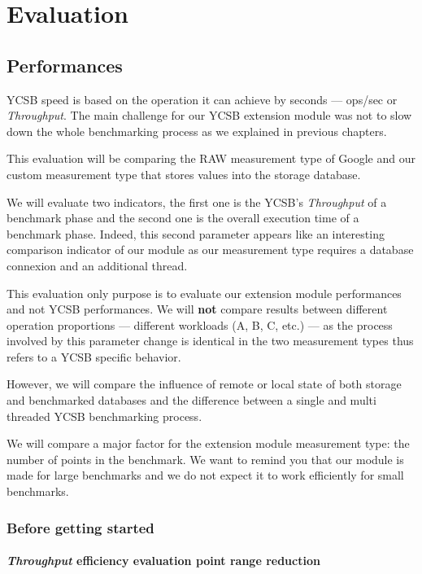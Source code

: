 \documentclass[a4paper,11pt]{report}
\begin{document}
\chapter{Evaluation}

\section{Performances}

YCSB speed is based on the operation it can achieve by seconds --- ops/sec or \textit{Throughput}. The main challenge for our YCSB extension module was not to slow down the whole benchmarking process as we explained in previous chapters.

This evaluation will be comparing the RAW measurement type of Google and our custom measurement type that stores values into the storage database.

We will evaluate two indicators, the first one is the YCSB's \textit{Throughput} of a benchmark phase and the second one is the overall execution time of a benchmark phase. Indeed, this second parameter appears like an interesting comparison indicator of our module as our measurement type requires a database connexion and an additional thread.

\bigskip

This evaluation only purpose is to evaluate our extension module performances and not YCSB performances. We will \textbf{not} compare results between different operation proportions --- different workloads (A, B, C, etc.) --- as the process involved by this parameter change is identical in the two measurement types thus refers to a YCSB specific behavior.

However, we will compare the influence of remote or local state of both storage and benchmarked databases and the difference between a single and multi threaded YCSB benchmarking process. 

We will compare a major factor for the extension module measurement type: the number of points in the benchmark. We want to remind you that our module is made for large benchmarks and we do not expect it to work efficiently for small benchmarks.

\subsection{Before getting started}

\subsubsection{\textit{Throughput} efficiency evaluation point range reduction}
\end{document}
